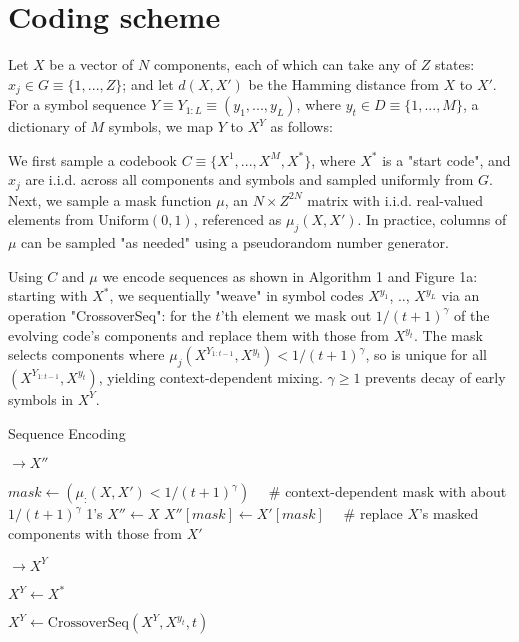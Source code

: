\documentclass{article}
\begin{document}
\section{Coding scheme}

Let $X$ be a vector of $N$ components, each of which can take any of $Z$ states: $x_j \in G \equiv \{1,...,Z\}$; and let $d(X, X')$ be the Hamming distance from $X$ to $X'$. For a symbol sequence $Y \equiv Y_{1:L} \equiv (y_1, ..., y_L)$, where $y_t \in D \equiv \{1, ..., M\}$, a dictionary of $M$ symbols, we map $Y$ to $X^Y$ as follows:

We first sample a codebook $C \equiv \{X^1, ..., X^M, X^*\}$, where $X^*$ is a "start code", and $x_j$ are i.i.d. across all components and symbols and sampled uniformly from $G$. Next, we sample a mask function $\mu$, an $N \times Z^{2N}$ matrix with i.i.d. real-valued elements from $\textrm{Uniform}(0, 1)$, referenced as $\mu_j(X, X')$. In practice, columns of $\mu$ can be sampled "as needed" using a pseudorandom number generator.

Using $C$ and $\mu$ we encode sequences as shown in Algorithm 1 and Figure 1a: starting with $X^*$, we sequentially "weave" in symbol codes $X^{y_1}$, .., $X^{y_L}$ via an operation "CrossoverSeq": for the $t$'th element we mask out $1/(t+1)^\gamma$ of the evolving code's components and replace them with those from $X^{y_t}$. The mask selects components where $\mu_j(X^{Y_{1:t-1}}, X^{y_t}) < 1/(t+1)^\gamma$, so is unique for all $(X^{Y_{1:t-1}}, X^{y_t})$, yielding context-dependent mixing. $\gamma \geq 1$ prevents decay of early symbols in $X^Y$.

\begin{algorithm}
\caption{Sequence Encoding}
\label{alg:1}

\begin{algorithmic}[0]
 $\rightarrow X''$

\State $mask \gets (\mu_:(X, X') < 1/(t+1)^\gamma) \quad$  \# context-dependent mask with about $1/(t+1)^\gamma$ 1's
\State $X'' \gets X$
\State $X''[mask] \gets X'[mask] \quad$  \# replace $X$'s masked components with those from $X'$

\EndFunction

 $\rightarrow X^Y$

\State $X^Y \gets X^*$

\State $X^Y \gets \textrm{CrossoverSeq}(X^Y, X^{y_t}, t)$

\EndFor

\EndFunction

\end{algorithmic}
\end{algorithm}
\end{document}

